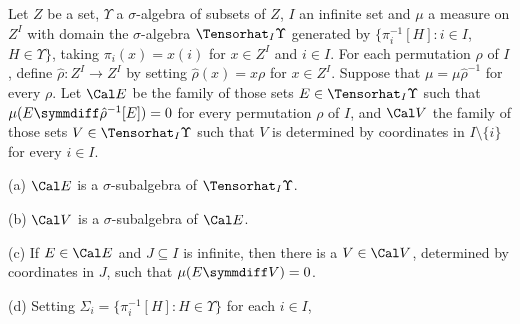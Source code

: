  Let $Z$ be a set, $\Upsilon$ a
$\sigma$-algebra of subsets of $Z$, $I$ an infinite set and $\mu$ a
measure on $Z^I$ with domain the $\sigma$-algebra $\Tensorhat_I\Upsilon$
generated by
$\{\pi_i^{-1}[H]:i\in I$, $H\in\Upsilon\}$, taking $\pi_i(x)=x(i)$ for
$x\in Z^I$ and $i\in I$.   For each permutation $\rho$ of $I$, define
$\hat\rho:Z^I\to Z^I$ by setting $\hat\rho(x)=x\rho$ for $x\in Z^I$.
Suppose that $\mu=\mu\hat\rho^{-1}$ for every $\rho$.   Let $\Cal E$ be
the family of those sets $E\in\Tensorhat_I\Upsilon$ such that
$\mu(E\symmdiff\hat\rho^{-1}[E])=0$ for every permutation $\rho$ of $I$,
and $\Cal V$ the family of those sets $V\in\Tensorhat_I\Upsilon$ such
that $V$ is determined by coordinates in $I\setminus\{i\}$ for every
$i\in I$.

(a) $\Cal E$ is a $\sigma$-subalgebra of $\Tensorhat_I\Upsilon$.

(b) $\Cal V$ is a $\sigma$-subalgebra of $\Cal E$.

(c) If $E\in\Cal E$ and $J\subseteq I$ is infinite, then there is a
$V\in\Cal V$, determined by coordinates in $J$, such that
$\mu(E\symmdiff V)=0$.

(d) Setting $\Sigma_i=\{\pi_i^{-1}[H]:H\in\Upsilon\}$ for each $i\in I$,



